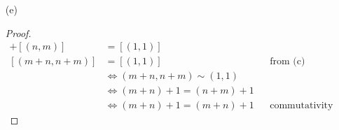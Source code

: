 \documentclass[13pt]{article}
\begin{document}
\begin{enumerate}
\item [(e)]
  \begin{proof}
    \begin{align*}
      [(m, n)] + [(n, m)] &= [(1, 1)] \\
      [(m + n, n + m)] &= [(1, 1)] && \text{from (c)} \\
                          &\iff (m + n, n + m) \sim (1, 1) \\
                          &\iff (m + n) + 1 = (n + m) + 1 \\
                          &\iff (m + n) + 1 = (m + n) + 1 &&\text{commutativity and associativity of addition}
    \end{align*}
  \end{proof}
\end{enumerate}
\end{document}
